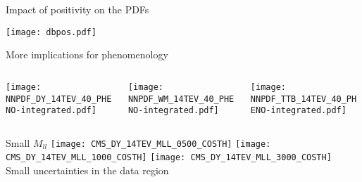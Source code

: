 \begin{frame}[t]{Impact of positivity on the PDFs}
    \begin{center}
        \texttt{[image: dbpos.pdf]}
    \end{center}
\end{frame}



\begin{frame}{More implications for phenomenology}
    \begin{columns}
        \begin{column}[T]{0.32\textwidth}
            \centering
            \texttt{[image: NNPDF\_DY\_14TEV\_40\_PHENO-integrated.pdf]}
        \end{column}
        \begin{column}[T]{0.32\textwidth}
            \centering
            \texttt{[image: NNPDF\_WM\_14TEV\_40\_PHENO-integrated.pdf]}\\
        \end{column}
        \begin{column}[T]{0.32\textwidth}
            \centering
            \texttt{[image: NNPDF\_TTB\_14TEV\_40\_PHENO-integrated.pdf]}
        \end{column}
    \end{columns}
\end{frame}


\begin{frame}{Small $M_{ll}$}
    \centering
    \texttt{[image: CMS\_DY\_14TEV\_MLL\_0500\_COSTH]}
    \texttt{[image: CMS\_DY\_14TEV\_MLL\_1000\_COSTH]}
    \texttt{[image: CMS\_DY\_14TEV\_MLL\_3000\_COSTH]}\\
    Small uncertainties in the data region
\end{frame}


